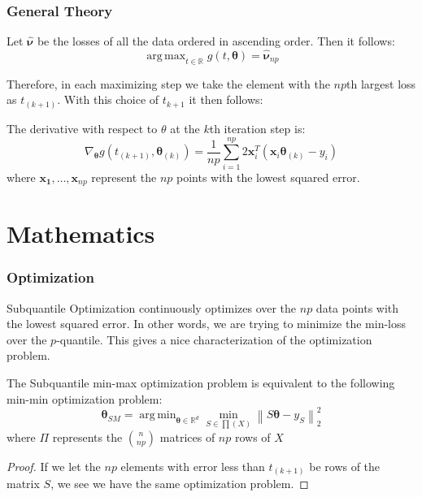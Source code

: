 \documentclass[
11pt, %
serif
]{beamer}
\DeclareMathOperator*{\argmax}{arg\,max}
\DeclareMathOperator*{\argmin}{arg\,min}
\newcommand{\norm}[1]{\left\lVert#1\right\rVert}
\begin{document}
	\begin{frame}
		\frametitle{General Theory}
		
		\begin{lemma}
			Let $\hat{\boldsymbol{\nu}}$ be the losses of all the data ordered in ascending order. Then it follows:
			\begin{equation}
				\argmax_{t \in \mathbb{R}}g(t,\boldsymbol{\theta}) = \hat{\boldsymbol{\nu}}_{np}
			\end{equation}
		\end{lemma}
		Therefore, in each maximizing step we take the element with the $np$th largest loss as $t_{(k+1)}$. With this choice of $t_{k+1}$ it then follows:
		\begin{lemma}
			The derivative with respect to $\theta$ at the $k$th iteration step is:
			\begin{equation*}
				\nabla_{\boldsymbol{\theta}}g(t_{(k+1)},\boldsymbol{\theta}_{(k)}) = \frac{1}{np}\sum_{i=1}^{np}2\boldsymbol{x}_i^T (\boldsymbol{x}_i \boldsymbol{\theta}_{(k)} - y_i)
			\end{equation*}
			where $\boldsymbol{x_1},\dots,\boldsymbol{x}_{np}$ represent the $np$ points with the lowest squared error.
		\end{lemma}
		
	\end{frame}

	\section{Mathematics}
	
	\begin{frame}
		\frametitle{Optimization}
		
		Subquantile Optimization continuously optimizes over the $np$ data points with the lowest squared error. In other words, we are trying to minimize the min-loss over the $p$-quantile. This gives a nice characterization of the optimization problem.
		
		\smallskip %
		
		\begin{theorem}
			The Subquantile min-max optimization problem is equivalent to the following min-min optimization problem:
			\begin{equation*}
				\boldsymbol{\theta}_{SM} = \argmin_{\boldsymbol{\theta} \in \mathbb{R}^d}\min_{S \in \prod(X)}\norm{S\boldsymbol{\theta} - y_S}_2^2
			\end{equation*}
			where $\Pi$ represents the $\binom{n}{np}$ matrices of $np$ rows of $X$
		\end{theorem}
		\begin{proof}
			If we let the $np$ elements with error less than $t_{(k+1)}$ be rows of the matrix $S$, we see we have the same optimization problem.
		\end{proof}
	\end{frame}
\end{document}
